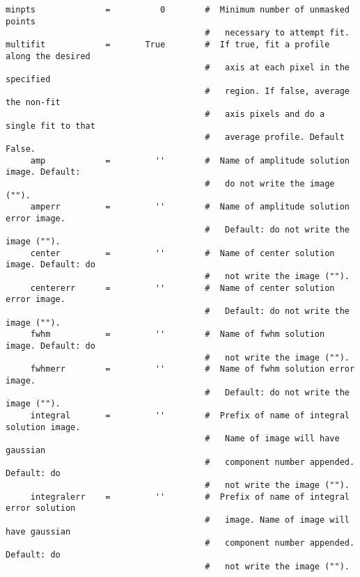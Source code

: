 \begin{verbatim}
minpts              =          0        #  Minimum number of unmasked points
                                        #   necessary to attempt fit.
multifit            =       True        #  If true, fit a profile along the desired
                                        #   axis at each pixel in the specified
                                        #   region. If false, average the non-fit
                                        #   axis pixels and do a single fit to that
                                        #   average profile. Default False.
     amp            =         ''        #  Name of amplitude solution image. Default:
                                        #   do not write the image ("").
     amperr         =         ''        #  Name of amplitude solution error image.
                                        #   Default: do not write the image ("").
     center         =         ''        #  Name of center solution image. Default: do
                                        #   not write the image ("").
     centererr      =         ''        #  Name of center solution error image.
                                        #   Default: do not write the image ("").
     fwhm           =         ''        #  Name of fwhm solution image. Default: do
                                        #   not write the image ("").
     fwhmerr        =         ''        #  Name of fwhm solution error image.
                                        #   Default: do not write the image ("").
     integral       =         ''        #  Prefix of name of integral solution image.
                                        #   Name of image will have gaussian
                                        #   component number appended.  Default: do
                                        #   not write the image ("").
     integralerr    =         ''        #  Prefix of name of integral error solution
                                        #   image. Name of image will have gaussian
                                        #   component number appended.  Default: do
                                        #   not write the image ("").


\end{verbatim}
